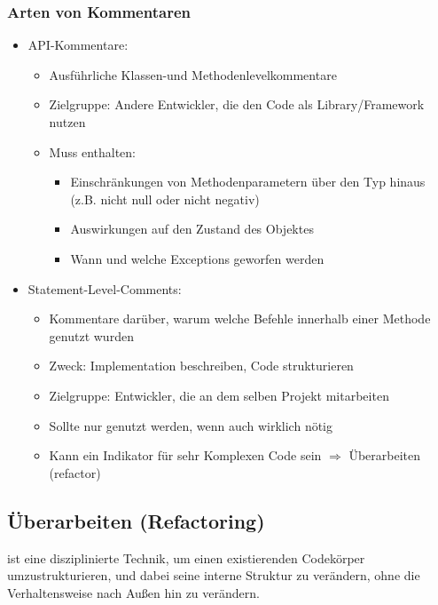 \documentclass[
    ngerman,
    color=3b,
    summary,
    boxarc,
    main,
]{rubos-tuda-template}
\begin{document}
\subsubsection{Arten von Kommentaren}
\begin{itemize}
    \item API-Kommentare:\begin{itemize}
              \item Ausführliche Klassen-und Methodenlevelkommentare
              \item Zielgruppe: Andere Entwickler, die den Code als Library/Framework nutzen
              \item Muss enthalten:\begin{itemize}
                        \item Einschränkungen von Methodenparametern über den Typ hinaus (z.B. nicht null oder nicht negativ)
                        \item Auswirkungen auf den Zustand des Objektes
                        \item Wann und welche Exceptions geworfen werden
                    \end{itemize}
          \end{itemize}
    \item Statement-Level-Comments:\begin{itemize}
              \item Kommentare darüber, warum welche Befehle innerhalb einer Methode genutzt wurden
              \item Zweck: Implementation beschreiben, Code strukturieren
              \item Zielgruppe: Entwickler, die an dem selben Projekt mitarbeiten
              \item Sollte nur genutzt werden, wenn auch wirklich nötig
              \item Kann ein Indikator für sehr Komplexen Code sein $\Rightarrow$ Überarbeiten (refactor)
          \end{itemize}
\end{itemize}

\clearpage
\subsection{Überarbeiten (Refactoring)}
\begin{definition}[Refactoring]
    ist eine disziplinierte Technik, um einen existierenden Codekörper umzustrukturieren, und dabei seine interne Struktur zu verändern, ohne die Verhaltensweise nach Außen hin zu verändern.
\end{definition}
\end{document}
